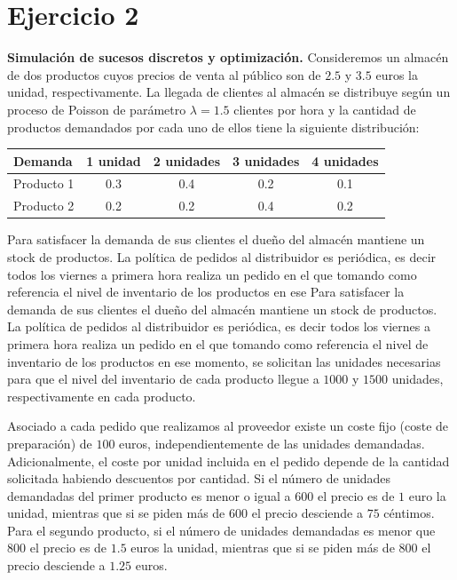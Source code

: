 \documentclass[a4paper,12pt]{article}
\begin{document}
	
	
	
	
	
\newpage
	\section*{Ejercicio 2}
	\textbf{Simulación de sucesos discretos y optimización.} Consideremos un almacén de dos productos cuyos precios de venta al público
 son de $2.5$ y $3.5$ euros la unidad, respectivamente. La llegada de clientes al
almacén se distribuye según un proceso de Poisson de parámetro $\lambda = 1.5$ clientes
por hora y la cantidad de productos demandados por cada uno de ellos tiene la
siguiente distribución:
	
	\begin{table}[H]
		\centering
		\begin{tabular}{|l||c|c|c|c|}
			\hline
			Demanda    & 1 unidad & 2 unidades & 3 unidades & 4 unidades \\ \hline \hline
			Producto 1 & 0.3      & 0.4        & 0.2        & 0.1        \\ \hline
			Producto 2 & 0.2      & 0.2        & 0.4        & 0.2        \\ \hline
		\end{tabular}
	\end{table}

	Para satisfacer la demanda de sus clientes el dueño del almacén mantiene un
 stock de productos. La política de pedidos al distribuidor es periódica, es decir
 todos los viernes a primera hora realiza un pedido en el que tomando como
referencia el nivel de inventario de los productos en ese Para satisfacer la demanda de sus clientes el dueño del almacén mantiene un
 stock de productos. La política de pedidos al distribuidor es periódica, es decir
todos los viernes a primera hora realiza un pedido en el que tomando como
referencia el nivel de inventario de los productos en ese momento, se solicitan
las unidades necesarias para que el nivel del inventario de cada producto llegue
a $1000$ y $1500$ unidades, respectivamente en cada producto.

	
	Asociado a cada pedido que realizamos al proveedor existe un coste fijo (coste
de preparación) de $100$ euros, independientemente de las unidades
demandadas. Adicionalmente, el coste por unidad incluida en el pedido depende de la cantidad solicitada habiendo descuentos por cantidad. Si el número de
unidades demandadas del primer producto es menor o igual a $600$ el precio es
de $1$ euro la unidad, mientras que si se piden más de $600$ el precio desciende a
$75$ céntimos. Para el segundo producto, si el número de unidades demandadas
es menor que $800$ el precio es de $1.5$ euros la unidad, mientras que si se piden
más de $800$ el precio desciende a $1.25$ euros.
	
\end{document}
